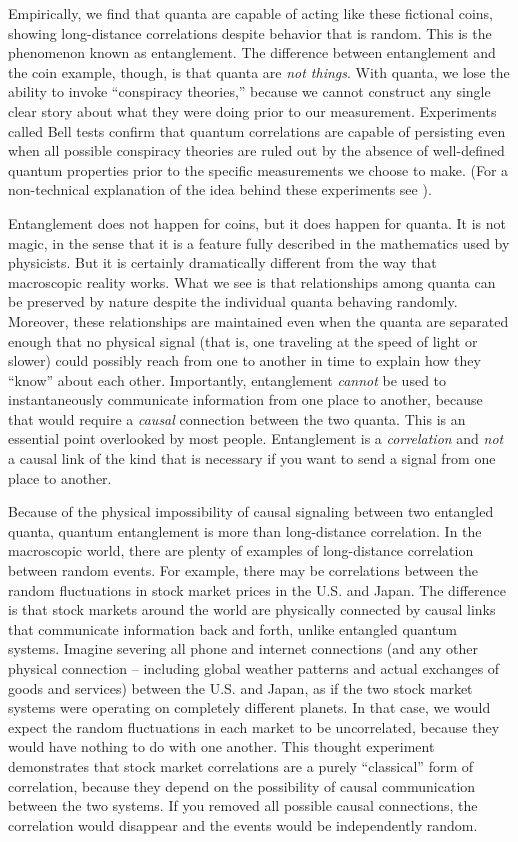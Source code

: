 \documentclass[12pt,onecolumn,preprintnumbers,amsmath,amssymbn,reprint,nofootinbib,superscriptaddress]{revtex4}    %
\begin{document}
Empirically, we find that quanta are capable of acting like these fictional coins, showing long-distance correlations despite behavior that is random.  This is the phenomenon known as entanglement.  The difference between entanglement and the coin example, though, is that quanta are {\em not things}. With quanta, we lose the ability to invoke ``conspiracy theories,'' because we cannot construct any single clear story about what they were doing prior to our measurement.  Experiments called Bell tests confirm that quantum correlations are capable of persisting even when all possible conspiracy theories are ruled out by the absence of well-defined quantum properties prior to the specific measurements we choose to make. (For a non-technical explanation of the idea behind these experiments see \cite{cakes}). 

Entanglement does not happen for coins, but it does happen for quanta.  It is not magic, in the sense that it is a feature fully described in the mathematics used by physicists.  But it is certainly dramatically different from the way that macroscopic reality works. What we see is that relationships among quanta can be preserved by nature despite the individual quanta behaving randomly.  Moreover, these relationships are maintained even when the quanta are separated enough that no physical signal (that is, one traveling at the speed of light or slower) could possibly reach from one to another in time to explain how they ``know'' about each other. Importantly, entanglement \emph{cannot} be used to instantaneously communicate  information from one place to another, because that would require a {\em causal} connection between the two quanta.  This is an essential point overlooked by most people.  Entanglement is a {\em correlation} and {\em not} a causal link of the kind that is necessary if you want to send a signal from one place to another. 

Because of the physical impossibility of causal signaling between two entangled quanta, quantum entanglement is more than long-distance correlation. In the macroscopic world, there are plenty of examples of long-distance correlation between random events.  For example, there may be correlations between the random fluctuations in stock market prices in the U.S. and Japan.  The difference is that stock markets around the world are physically connected by causal links that communicate information back and forth, unlike entangled quantum systems.  Imagine severing all phone and internet connections (and any other physical connection -- including global weather patterns and actual exchanges of goods and services) between the U.S. and Japan, as if the two stock market systems were operating on completely different planets.  In that case, we would expect the random fluctuations in each market to be uncorrelated, because they would have nothing to do with one another.  This thought experiment demonstrates that stock market correlations are a purely ``classical'' form of correlation, because they depend on the possibility of causal communication between the two systems. If you removed all possible causal connections, the correlation would disappear and the events would be independently random.  
\end{document}

